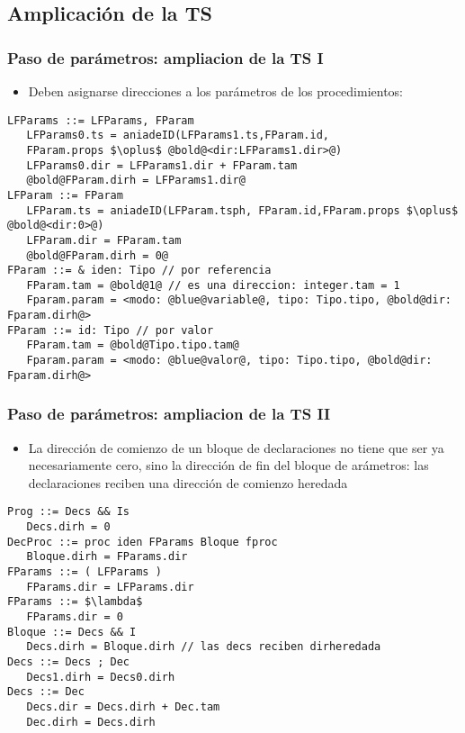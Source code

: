 \documentclass[hyperref={pdfpagelabels=false},tree-dvips,compress]{beamer}
\begin{document}
\subsection{Amplicación de la TS}
\begin{frame}[fragile]
\frametitle{Paso de parámetros: ampliacion de la TS I}

\begin{itemize}
	\item Deben asignarse direcciones a los parámetros de los procedimientos:
\end{itemize}

\begin{lstlisting}[style=gramaticas,basicstyle=\scriptsize\ttfamily,mathescape]
LFParams ::= LFParams, FParam
   LFParams0.ts = aniadeID(LFParams1.ts,FParam.id,
   FParam.props $\oplus$ @bold@<dir:LFParams1.dir>@)
   LFParams0.dir = LFParams1.dir + FParam.tam
   @bold@FParam.dirh = LFParams1.dir@
LFParam ::= FParam
   LFParam.ts = aniadeID(LFParam.tsph, FParam.id,FParam.props $\oplus$ @bold@<dir:0>@)
   LFParam.dir = FParam.tam
   @bold@FParam.dirh = 0@
FParam ::= & iden: Tipo // por referencia
   FParam.tam = @bold@1@ // es una direccion: integer.tam = 1
   Fparam.param = <modo: @blue@variable@, tipo: Tipo.tipo, @bold@dir: Fparam.dirh@>
FParam ::= id: Tipo // por valor
   FParam.tam = @bold@Tipo.tipo.tam@
   Fparam.param = <modo: @blue@valor@, tipo: Tipo.tipo, @bold@dir: Fparam.dirh@>
\end{lstlisting}

\end{frame}
\begin{frame}[fragile]
\frametitle{Paso de parámetros: ampliacion de la TS II}

\begin{itemize}
	\item La dirección de comienzo de un bloque de declaraciones no tiene que ser ya necesariamente cero, sino la dirección de fin del bloque de arámetros: las declaraciones reciben una dirección de comienzo heredada
\end{itemize}

\begin{lstlisting}[style=gramaticas,basicstyle=\scriptsize\ttfamily,mathescape]
Prog ::= Decs && Is
   Decs.dirh = 0
DecProc ::= proc iden FParams Bloque fproc
   Bloque.dirh = FParams.dir
FParams ::= ( LFParams )
   FParams.dir = LFParams.dir
FParams ::= $\lambda$
   FParams.dir = 0
Bloque ::= Decs && I
   Decs.dirh = Bloque.dirh // las decs reciben dirheredada
Decs ::= Decs ; Dec
   Decs1.dirh = Decs0.dirh
Decs ::= Dec
   Decs.dir = Decs.dirh + Dec.tam
   Dec.dirh = Decs.dirh
\end{lstlisting}

\end{frame}
\end{document}
